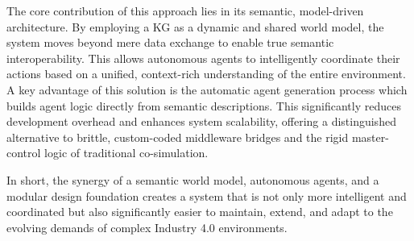 \documentclass{article} %
\begin{document}
The core contribution of this approach lies in its semantic, model-driven architecture. By employing a KG as a dynamic and shared world model, the system moves beyond mere data exchange to enable true semantic interoperability. This allows autonomous agents to intelligently coordinate their actions based on a unified, context-rich understanding of the entire environment. A key advantage of this solution is the automatic agent generation process which builds agent logic directly from semantic descriptions. This significantly reduces development overhead and enhances system scalability, offering a distinguished alternative to brittle, custom-coded middleware bridges and the rigid master-control logic of traditional co-simulation.

In short, the synergy of a semantic world model, autonomous agents, and a modular design foundation creates a system that is not only more intelligent and coordinated but also significantly easier to maintain, extend, and adapt to the evolving demands of complex Industry 4.0 environments.
\end{document}
